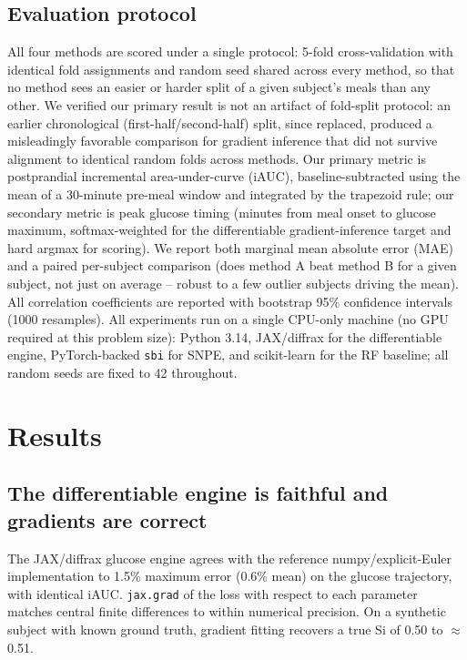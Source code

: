 \documentclass[letterpaper]{article} %
\begin{document}
\subsection{Evaluation protocol}
All four methods are scored under a single protocol: 5-fold cross-validation with identical fold
assignments and random seed shared across every method, so that no method sees an easier or
harder split of a given subject's meals than any other. We verified our primary result is not an
artifact of fold-split protocol: an earlier chronological (first-half/second-half) split, since
replaced, produced a misleadingly favorable comparison for gradient inference that did not survive
alignment to identical random folds across methods. Our primary metric is postprandial incremental
area-under-curve (iAUC), baseline-subtracted using the mean of a 30-minute pre-meal window and
integrated by the trapezoid rule; our secondary metric is peak glucose timing (minutes from meal
onset to glucose maximum, softmax-weighted for the differentiable gradient-inference target and
hard argmax for scoring). We report both marginal mean absolute error (MAE) and a paired
per-subject comparison (does method A beat method B for a given subject, not just on average --
robust to a few outlier subjects driving the mean). All correlation coefficients are reported with
bootstrap 95\% confidence intervals (1000 resamples). All experiments run on a single CPU-only
machine (no GPU required at this problem size): Python 3.14, JAX/diffrax for the differentiable
engine, PyTorch-backed \texttt{sbi} \citep{tejerocantero2020sbi} for SNPE, and scikit-learn for the
RF baseline; all random seeds are fixed to 42 throughout.

\section{Results}

\subsection{The differentiable engine is faithful and gradients are correct}
The JAX/diffrax glucose engine agrees with the reference numpy/explicit-Euler implementation to
1.5\% maximum error (0.6\% mean) on the glucose trajectory, with identical iAUC. \texttt{jax.grad}
of the loss with respect to each parameter matches central finite differences to within numerical
precision. On a synthetic subject with known ground truth, gradient fitting recovers a true Si of
0.50 to $\approx$0.51.
\end{document}
